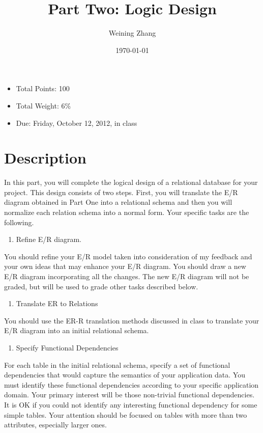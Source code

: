 \documentclass[11pt]{article}
\title{Part Two: Logic Design}
\author{Weining Zhang}
\date{\today}
\begin{document}
\maketitle


\begin{itemize}
\item Total Points: 100
\item Total Weight: 6\%
\item Due: Friday, October 12, 2012, in class
\end{itemize}

\section*{Description}
\label{sec-1}


In this part, you will complete the logical design of a relational
database for your project. This design consists of two steps. First,
you will translate the E/R diagram obtained in Part One into a
relational schema and then you will normalize each relation schema
into a normal form. Your specific tasks are the following.

\begin{enumerate}
\item Refine E/R diagram.
\end{enumerate}

You should refine your E/R model taken into consideration of my
feedback and your own ideas that may enhance your E/R diagram. You
should draw a new E/R diagram incorporating all the changes. The new
E/R diagram will not be graded, but will be used to grade other tasks
described below.

\begin{enumerate}
\item Translate ER to Relations
\end{enumerate}

You should use the ER-R translation methods discussed in class to
translate your E/R diagram into an initial relational schema.

\begin{enumerate}
\item Specify Functional Dependencies
\end{enumerate}

For each table in the initial relational schema, specify a set of
functional dependencies that would capture the semantics of your
application data. You must identify these functional dependencies
according to your specific application domain. Your primary interest
will be those non-trivial functional dependencies. It is OK if you
could not identify any interesting functional dependency for some
simple tables. Your attention should be focused on tables with more
than two attributes, especially larger ones.
\end{document}
